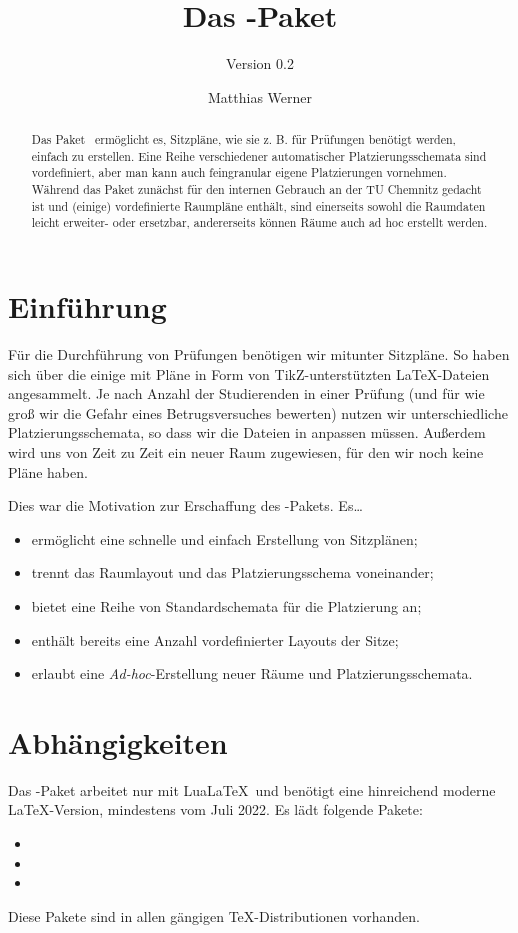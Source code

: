 \documentclass{cnltx-doc}
\author{Matthias Werner}
\subtitle{Version 0.2}
\title{Das \pkg*{\packagename}-Paket}
\def\packagename{tucseating}
\def\thepkg{\pkg*{\packagename}}
\begin{document}
\maketitle

\begin{abstract}\noindent
  Das Paket \thepkg\ ermöglicht es, Sitzpläne, wie sie z. B. für Prüfungen
  benötigt werden, einfach zu erstellen. Eine Reihe
  verschiedener automatischer Platzierungsschemata sind vordefiniert, 
  aber man kann auch feingranular eigene Platzierungen vornehmen.
  Während das Paket zunächst für den internen
  Gebrauch an der TU Chemnitz gedacht ist und
  (einige) vordefinierte Raumpläne enthält, sind
  einerseits sowohl die Raumdaten leicht erweiter-
  oder ersetzbar, andererseits können Räume auch
  ad hoc erstellt werden.
\end{abstract}
\tableofcontents

\section{Einführung}
Für die Durchführung von Prüfungen benötigen wir mitunter Sitzpläne.
So haben sich über die einige mit Pläne  in Form von TikZ-unterstützten
\LaTeX-Dateien angesammelt. 
Je nach Anzahl der Studierenden in einer Prüfung (und für wie groß wir die
Gefahr eines Betrugsversuches bewerten) nutzen wir unterschiedliche
Platzierungsschemata, so dass wir die Dateien in anpassen müssen.
Außerdem wird uns von Zeit zu Zeit ein neuer Raum zugewiesen, für den wir noch
keine Pläne haben.

Dies war die Motivation zur Erschaffung des \thepkg-Pakets. Es\ldots
\begin{itemize}
  \item ermöglicht eine schnelle und einfach Erstellung von Sitzplänen;
  \item trennt das Raumlayout und das Platzierungsschema voneinander;
  \item bietet eine Reihe von Standardschemata für die Platzierung an;
  \item enthält bereits eine Anzahl vordefinierter Layouts der Sitze;
  \item erlaubt eine \emph{Ad-hoc}-Erstellung neuer Räume und Platzierungsschemata.
\end{itemize}

\section{Abhängigkeiten}
Das \thepkg-Paket arbeitet nur mit Lua\LaTeX\ und benötigt eine hinreichend
moderne \LaTeX-Version, mindestens vom Juli 2022.
Es lädt folgende Pakete:
\begin{itemize}
  \item {} 
  \item {}
  \item {}
\end{itemize}
Diese Pakete sind in allen gängigen \TeX-Distributionen vorhanden.
\end{document}
